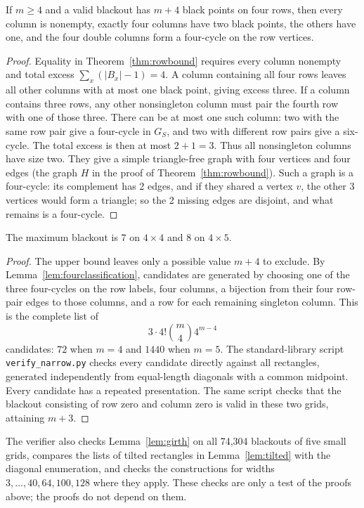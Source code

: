 \begin{lemma}\label{lem:fourclassification}
If $m\ge4$ and a valid blackout has $m+4$ black points on four rows, then every
column is nonempty, exactly four columns have two black points, the others have
one, and the four double columns form a four-cycle on the row vertices.
\end{lemma}
\begin{proof}
Equality in Theorem~\ref{thm:rowbound} requires every column nonempty and total
excess $\sum_x(|B_x|-1)=4$. A column containing all four rows leaves all other
columns with at most one black point, giving excess three. If a column contains
three rows, any other nonsingleton column must pair the fourth row with one of
those three. There can be at most one such column: two with the same row pair
give a four-cycle in $G_S$, and two with different row pairs give a six-cycle.
The total excess is then at most $2+1=3$. Thus all nonsingleton columns have
size two. They give a simple triangle-free graph with four vertices and four
edges (the graph $H$ in the proof of Theorem~\ref{thm:rowbound}). Such a graph is
a four-cycle: its complement has 2 edges, and if they shared a vertex $v$, the
other 3 vertices would form a triangle; so the 2 missing edges are disjoint,
and what remains is a four-cycle.
\end{proof}

\begin{corollary}\label{cor:fourboundary}
The maximum blackout is $7$ on $4\times4$ and $8$ on $4\times5$.
\end{corollary}
\begin{proof}
The upper bound leaves only a possible value $m+4$ to exclude. By
Lemma~\ref{lem:fourclassification}, candidates are generated by choosing one of
the three four-cycles on the row labels, four columns, a bijection from their
four row-pair edges to those columns, and a row for each remaining singleton
column. This is the complete list of
\[
3\cdot4!\binom m4 4^{m-4}
\]
candidates: $72$ when $m=4$ and $1440$ when $m=5$. The standard-library script
\texttt{verify\_narrow.py} checks every candidate directly against all rectangles,
generated independently from equal-length diagonals with a common midpoint.
Every candidate has a repeated presentation. The same script checks that
the blackout consisting of row zero and column zero is valid in these two grids,
attaining $m+3$.
\end{proof}

The verifier also checks Lemma~\ref{lem:girth} on all 74,304 blackouts of five
small grids, compares the lists of tilted rectangles in Lemma~\ref{lem:tilted}
with the diagonal enumeration, and checks the constructions for widths
$3,\ldots,40,64,100,128$ where they apply. These checks are only a test of the
proofs above; the proofs do not depend on them.
